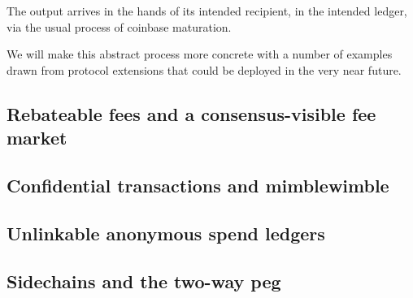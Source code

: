 The output arrives in the hands of its intended recipient, in the
intended ledger, via the usual process of coinbase maturation.

We will make this abstract process more concrete with a number of
examples drawn from protocol extensions that could be deployed in the
very near future.

\subsection{Rebateable fees and a consensus-visible fee market}

\subsection{Confidential transactions and mimblewimble}

\subsection{Unlinkable anonymous spend ledgers}

\subsection{Sidechains and the two-way peg}
